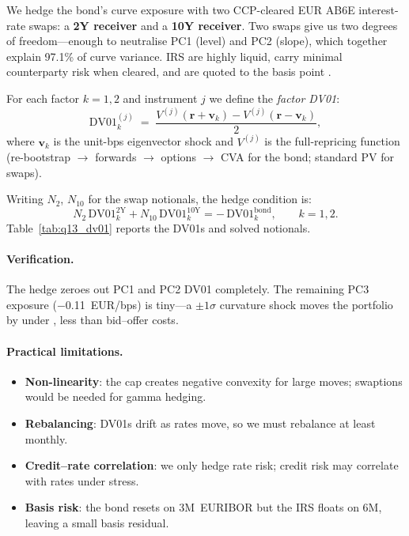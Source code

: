 \documentclass[11pt,a4paper]{article}
\begin{document}
We hedge the bond's curve exposure with two CCP-cleared EUR AB6E
interest-rate swaps: a \textbf{2Y receiver} and a \textbf{10Y
receiver}.  Two swaps give us two degrees of freedom---enough to
neutralise PC1 (level) and PC2 (slope), which together explain 97.1\%
of curve variance.  IRS are highly liquid, carry minimal counterparty
risk when cleared, and are quoted to the basis point
\parencite[Ch.~7]{Hull2022}.

For each factor $k=1,2$ and instrument $j$ we define the
\emph{factor DV01}:
\begin{equation}
  \mathrm{DV01}_k^{(j)}
    \;=\; \frac{V^{(j)}(\mathbf{r}+\mathbf{v}_k)-V^{(j)}(\mathbf{r}-\mathbf{v}_k)}{2},
  \label{eq:q13_fdv01}
\end{equation}
where $\mathbf{v}_k$ is the unit-bps eigenvector shock and $V^{(j)}$
is the full-repricing function (re-bootstrap $\to$ forwards $\to$
options $\to$ CVA for the bond; standard PV for swaps).

Writing $N_{2}$, $N_{10}$ for the swap notionals, the hedge
condition is:
\begin{equation}
  N_{2}\,\mathrm{DV01}_k^{2\mathrm{Y}}
  + N_{10}\,\mathrm{DV01}_k^{10\mathrm{Y}}
  = -\,\mathrm{DV01}_k^{\mathrm{bond}},
  \qquad k = 1,2.
  \label{eq:q13_hedge}
\end{equation}
Table~\ref{tab:q13_dv01} reports the DV01s and solved notionals.

\paragraph{Verification.}
The hedge zeroes out PC1 and PC2 DV01 completely. The remaining PC3
exposure ($-$0.11~EUR/bps) is tiny---a $\pm 1\sigma$ curvature shock
moves the portfolio by under , less than bid--offer costs.

\paragraph{Practical limitations.}
\begin{itemize}[leftmargin=*]\setlength{\itemsep}{1pt}
  \item \textbf{Non-linearity}: the cap creates negative convexity
    for large moves; swaptions would be needed for gamma hedging.
  \item \textbf{Rebalancing}: DV01s drift as rates move, so we must
    rebalance at least monthly.
  \item \textbf{Credit--rate correlation}: we only hedge rate risk;
    credit risk may correlate with rates
    under stress.
  \item \textbf{Basis risk}: the bond resets on 3M~EURIBOR but the
    IRS floats on 6M, leaving a small basis residual.
\end{itemize}
\end{document}
